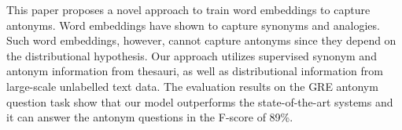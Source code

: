 This paper proposes a novel approach to train word embeddings to capture antonyms. Word embeddings have shown to capture synonyms and analogies. Such word embeddings, however, cannot capture antonyms since they depend on the distributional hypothesis. Our approach utilizes supervised synonym and antonym information from thesauri, as well as distributional information from large-scale unlabelled text data. The evaluation results on the GRE antonym question task show that our model outperforms the state-of-the-art systems and it can answer the antonym questions in the F-score of 89\%.
